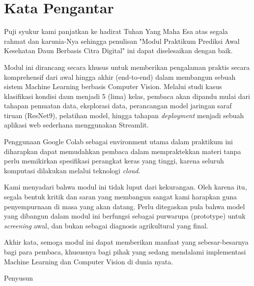 \chapter*{Kata Pengantar}

Puji syukur kami panjatkan ke hadirat Tuhan Yang Maha Esa atas segala rahmat dan karunia-Nya sehingga penulisan "Modul Praktikum Prediksi Awal Kesehatan Daun Berbasis Citra Digital" ini dapat diselesaikan dengan baik.

Modul ini dirancang secara khusus untuk memberikan pengalaman praktis secara komprehensif dari awal hingga akhir (end-to-end) dalam membangun sebuah sistem Machine Learning berbasis Computer Vision. Melalui studi kasus klasifikasi kondisi daun menjadi 5 (lima) kelas, pembaca akan dipandu mulai dari tahapan pemuatan data, eksplorasi data, perancangan model jaringan saraf tiruan (ResNet9), pelatihan model, hingga tahapan \textit{deployment} menjadi sebuah aplikasi web sederhana menggunakan Streamlit.

Penggunaan Google Colab sebagai environment utama dalam praktikum ini diharapkan dapat memudahkan pembaca dalam mempraktekkan materi tanpa perlu memikirkan spesifikasi perangkat keras yang tinggi, karena seluruh komputasi dilakukan melalui teknologi \textit{cloud}.

Kami menyadari bahwa modul ini tidak luput dari kekurangan. Oleh karena itu, segala bentuk kritik dan saran yang membangun sangat kami harapkan guna penyempurnaan di masa yang akan datang. Perlu ditegaskan pula bahwa model yang dibangun dalam modul ini berfungsi sebagai purwarupa (prototype) untuk \textit{screening} awal, dan bukan sebagai diagnosis agrikultural yang final.

Akhir kata, semoga modul ini dapat memberikan manfaat yang sebesar-besarnya bagi para pembaca, khususnya bagi pihak yang sedang mendalami implementasi Machine Learning dan Computer Vision di dunia nyata.

\vspace{2cm}
\begin{flushright}
Penyusun
\end{flushright}
